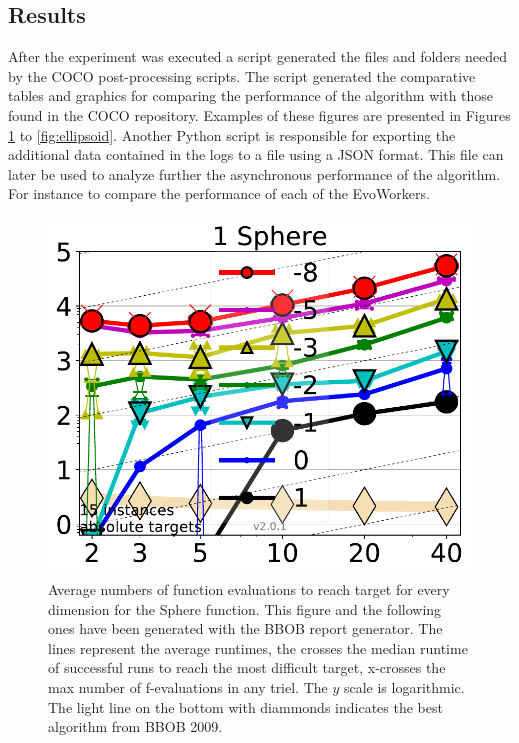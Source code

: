 


\subsection{Results}
\label{sec:results}
After the experiment was executed a script generated 
the files and folders needed by the COCO post-processing 
scripts. The script generated the comparative tables and
graphics for comparing the performance of the algorithm with
those found in the COCO repository. Examples of these figures
are presented in Figures \ref{fig:sphere} to \ref{fig:ellipsoid}.
Another Python script is responsible for exporting the additional 
data contained in the logs to a file using a JSON format. 
This file can later be used to analyze further the asynchronous 
performance of the algorithm.  For instance to compare the 
performance of each of the EvoWorkers.

\begin{figure}[h!t]
    \centering
        \includegraphics[width=5in]{img/Sphere.pdf}
    \caption{Average numbers of function evaluations to reach target
      for every dimension for the Sphere function. This figure and the
    following ones have been generated with the BBOB report
    generator. The lines represent the average runtimes, the crosses
    the median runtime of successful runs to reach the most difficult
    target, x-crosses the max number of f-evaluations in any
    triel. The $y$ scale is logarithmic. The light line on the bottom
    with diammonds indicates the best algorithm from BBOB 2009. }
  
\label{fig:sphere}
\end{figure}


